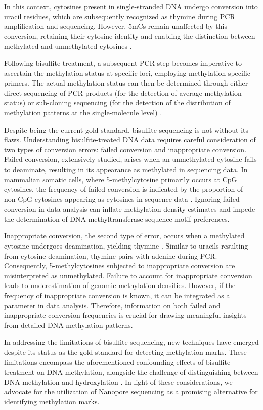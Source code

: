 In this context, cytosines present in single-stranded DNA undergo conversion into uracil residues, which are subsequently recognized as thymine during PCR amplification and sequencing. However, \acp{5mC} remain unaffected by this conversion, retaining their cytosine identity and enabling the distinction between methylated and unmethylated cytosines \citep{bisulfite2}. 

Following bisulfite treatment, a subsequent PCR step becomes imperative to ascertain the methylation status at specific loci, employing methylation-specific primers. The actual methylation status can then be determined through either direct sequencing of PCR products (for the detection of average methylation status) or sub-cloning sequencing (for the detection of the distribution of methylation patterns at the single-molecule level) \citep{bisulfite2}.

Despite being the current gold standard, bisulfite sequencing is not without its flaws. Understanding bisulfite-treated DNA data requires careful consideration of two types of conversion errors: failed conversion and inappropriate conversion. Failed conversion, extensively studied, arises when an unmethylated cytosine fails to deaminate, resulting in its appearance as methylated in sequencing data. In mammalian somatic cells, where 5-methylcytosine primarily occurs at CpG cytosines, the frequency of failed conversion is indicated by the proportion of non-CpG cytosines appearing as cytosines in sequence data \citep{bisulfite_failed_conv}. Ignoring failed conversion in data analysis can inflate methylation density estimates and impede the determination of DNA methyltransferase sequence motif preferences.

Inappropriate conversion, the second type of error, occurs when a methylated cytosine undergoes deamination, yielding thymine \citep{bisulfite_inappr_conv}. Similar to uracils resulting from cytosine deamination, thymine pairs with adenine during PCR. Consequently, 5-methylcytosines subjected to inappropriate conversion are misinterpreted as unmethylated. Failure to account for inappropriate conversion leads to underestimation of genomic methylation densities. However, if the frequency of inappropriate conversion is known, it can be integrated as a parameter in data analysis. Therefore, information on both failed and inappropriate conversion frequencies is crucial for drawing meaningful insights from detailed DNA methylation patterns.

In addressing the limitations of bisulfite sequencing, new techniques have emerged despite its status as the gold standard for detecting methylation marks. These limitations encompass the aforementioned confounding effects of bisulfite treatment on DNA methylation, alongside the challenge of distinguishing between DNA methylation and hydroxylation \citep{ont_vs_bisulfite}. In light of these considerations, we advocate for the utilization of Nanopore sequencing as a promising alternative for identifying methylation marks.

